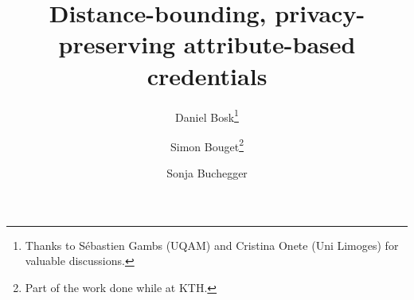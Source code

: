 \documentclass[USenglish]{article}
\begin{document}
\author{Daniel Bosk\thanks{%
    Thanks to Sébastien Gambs (UQAM) and Cristina Onete (Uni Limoges) for 
    valuable discussions.
}}
\author{Simon Bouget\thanks{%
    Part of the work done while at KTH.
}}
\author{Sonja Buchegger}

\title{%
  Distance-bounding, privacy-preserving attribute-based credentials
}


\end{document}

